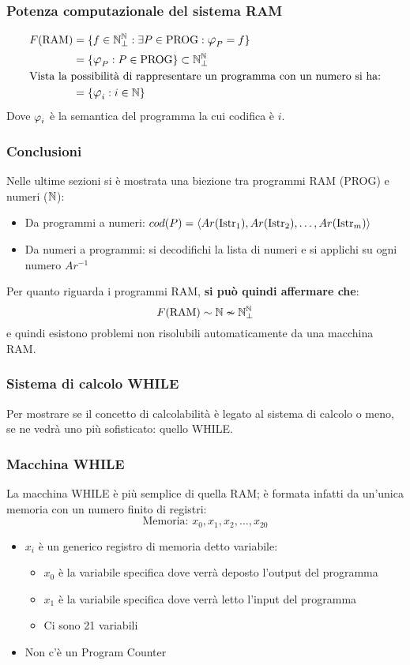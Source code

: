 \subsubsection*{Potenza computazionale del sistema RAM}
$$ \begin{aligned}
        F(\RAM) &= \{f\in\N_\perp^\N:\exists P \in \PROG: \semanticaRAM_P=f\}\\
                &= \{\semanticaRAM_P:P\in\PROG\} \subset \N_\perp^\N \\
                \multispan2{Vista la possibilità di rappresentare un programma
                 con un numero si ha:\hfill}\notag\\
                 &= \{\semanticaRAM_i:i\in\N\}
\end{aligned} $$
Dove $\semanticaRAM_i$ è la semantica del programma la cui codifica è $i$.
\subsubsection*{Conclusioni}
Nelle ultime sezioni si è mostrata una biezione tra programmi RAM (PROG) e numeri
($\mathbb{N}$):
    \begin{itemize}
        \item Da programmi a numeri:
            $cod(P)=\langle Ar(\text{Istr}_1),Ar(\text{Istr}_2),\dots,Ar(\text{Istr}_m)\rangle$
        \item Da numeri a programmi: si decodifichi la lista di numeri e si applichi su
            ogni numero $Ar^{-1}$
    \end{itemize}
Per quanto riguarda i programmi RAM, \textbf{si può quindi affermare che}:
$$ F(\text{RAM}) \sim \mathbb{N} \nsim \mathbb{N}^{\mathbb{N}}_\perp $$
e quindi esistono problemi non risolubili automaticamente da una macchina RAM.
\subsubsection{Sistema di calcolo WHILE}
Per mostrare se il concetto di calcolabilità è legato al sistema di calcolo o meno,
se ne vedrà uno più sofisticato: quello WHILE.
\subsubsection*{Macchina WHILE}
La macchina WHILE è più semplice di quella RAM; è formata infatti da un'unica memoria
con un numero finito di registri:
$$\text{Memoria: } x_0,x_1,x_2,\dots,x_{20}$$
\begin{itemize}
    \item $x_i$ è un generico registro di memoria detto variabile:
        \begin{itemize}
            \item $x_0$ è la variabile specifica dove verrà deposto l'output del programma
            \item $x_1$ è la variabile specifica dove verrà letto l'input del programma
            \item Ci sono 21 variabili
        \end{itemize}
    \item Non c'è un Program Counter
\end{itemize}

